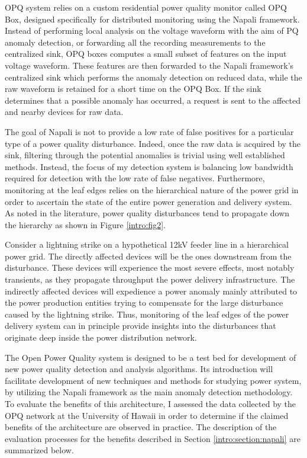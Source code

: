 OPQ system relies on a custom residential power quality monitor called OPQ Box, designed specifically for distributed monitoring using the Napali framework.
Instead of performing local analysis on the voltage waveform with the aim of PQ anomaly detection, or forwarding all the recording measurements to the centralized sink, OPQ boxes computes a small subset of features on the input voltage waveform.
These features are then forwarded to the Napali framework's centralized sink which performs the anomaly detection on reduced data, while the raw waveform is retained for a short time on the OPQ Box.
If the sink determines that a possible anomaly has occurred, a request is sent to the affected and nearby devices for raw data.

The goal of Napali is not to provide a low rate of false positives for a particular type of a power quality disturbance.
Indeed, once the raw data is acquired by the sink, filtering through the potential anomalies is trivial using well established methods.
Instead, the focus of my detection system is balancing low bandwidth required for detection with the low rate of false negatives.
Furthermore, monitoring at the leaf edges relies on the hierarchical nature of the power grid in order to ascertain the state of the entire power generation and delivery system.
As noted in the literature, power quality disturbances tend to propagate down the hierarchy as shown in Figure \ref{intro:fig2}.


Consider a lightning strike on a hypothetical 12kV feeder line in a hierarchical power grid.
The directly affected devices will be the ones downstream from the disturbance.
These devices will experience the most severe effects, most notably transients, as they propagate throughput the power delivery infrastructure.
The indirectly affected devices will expedience a power anomaly mainly attributed to the power production entities trying to compensate for the large disturbance caused by the lightning strike.
Thus, monitoring of the leaf edges of the power delivery system can in principle provide insights into the disturbances that originate deep inside the power distribution network.

The Open Power Quality system is designed to be a test bed for development of new power quality detection and analysis algorithms.
Its introduction will facilitate development of new techniques and methods for studying power system, by utilizing the Napali framework as the main anomaly detection methodology.
To evaluate the benefits of this architecture, I assessed the data collected by the OPQ network at the University of Hawaii in order to determine if the claimed benefits of the architecture are observed in practice.
The description of the evaluation processes for the benefits described in Section \ref{intro:section:napali} are summarized below.

